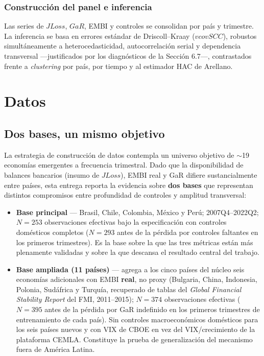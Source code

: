 \documentclass[5p,times,twocolumn,authoryear]{elsarticle}
\begin{document}
\subsubsection{Construcción del panel e inferencia}

Las series de $JLoss$, $GaR$, EMBI y controles se consolidan por país y trimestre. La inferencia se basa en errores estándar de Driscoll–Kraay ($vcovSCC$), robustos simultáneamente a heterocedasticidad, autocorrelación serial y dependencia transversal —justificados por los diagnósticos de la Sección 6.7—, contrastados frente a \textit{clustering} por país, por tiempo y al estimador HAC de Arellano.


\section{Datos}

\subsection{Dos bases, un mismo objetivo}

La estrategia de construcción de datos contempla un universo objetivo de $\sim$19 economías emergentes a frecuencia trimestral. Dado que la disponibilidad de balances bancarios (insumo de $JLoss$), EMBI real y GaR difiere sustancialmente entre países, esta entrega reporta la evidencia sobre \textbf{dos bases} que representan distintos compromisos entre profundidad de controles y amplitud transversal:

\begin{itemize}
    \item \textbf{Base principal} — Brasil, Chile, Colombia, México y Perú; 2007Q4–2022Q2; $N=253$ observaciones efectivas bajo la especificación con controles domésticos completos ($N=293$ antes de la pérdida por controles faltantes en los primeros trimestres). Es la base sobre la que las tres métricas están más plenamente validadas y sobre la que descansa el resultado central del trabajo.
    \item \textbf{Base ampliada (11 países)} — agrega a los cinco países del núcleo seis economías adicionales con EMBI \textbf{real}, no proxy (Bulgaria, China, Indonesia, Polonia, Sudáfrica y Turquía, recuperado de tablas del \textit{Global Financial Stability Report} del FMI, 2011–2015); $N=374$ observaciones efectivas ($N=395$ antes de la pérdida por GaR indefinido en los primeros trimestres de entrenamiento de cada país). Sin controles macroeconómicos domésticos para los seis países nuevos y con VIX de CBOE en vez del VIX/crecimiento de la plataforma CEMLA. Constituye la prueba de generalización del mecanismo fuera de América Latina.
\end{itemize}
\end{document}

